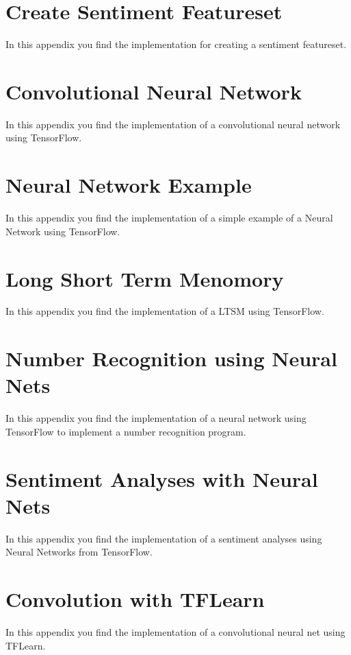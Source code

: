 \chapter{Create Sentiment Featureset}\label{code:create-sentiment-featureset}
In this appendix you find the implementation for creating a sentiment featureset.


\chapter{Convolutional Neural Network}\label{code:cnn}
In this appendix you find the implementation of a convolutional neural network using TensorFlow.


\chapter{Neural Network Example}\label{code:nn-example}
In this appendix you find the implementation of a simple example of a Neural Network using TensorFlow.


\chapter{Long Short Term Menomory}\label{code:ltsm}
In this appendix you find the implementation of a LTSM using TensorFlow.


\chapter{Number Recognition using Neural Nets}\label{code:number-recognition}
In this appendix you find the implementation of a neural network using TensorFlow to implement a number recognition program.


\chapter{Sentiment Analyses with Neural Nets}\label{code:sentiment}
In this appendix you find the implementation of a sentiment analyses using Neural Networks from TensorFlow.


\chapter{Convolution with TFLearn}\label{code:tflearn}
In this appendix you find the implementation of a convolutional neural net using TFLearn.

